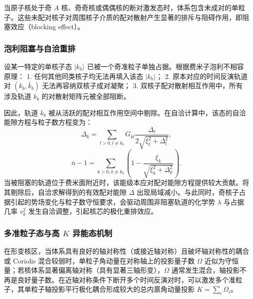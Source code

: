 当原子核处于奇 $A$ 核、奇奇核或偶偶核的断对激发态时，体系包含未成对的单粒子。这些未配对核子对周围核子介质的配对散射产生显著的排斥与阻碍作用，即阻塞效应（blocking effect）\cite{book-jain-nuclear-isomers}。


\subsubsection{泡利阻塞与自洽重排}\label{sec:2-3-泡利阻塞与自洽重排}


设某一特定的单核子态 $|k_b\rangle$ 已被一个奇准粒子单独占据。根据费米子泡利不相容原理：
1. 任何其他同类核子均无法再填入该态 $|k_b\rangle$；
2. 原本对应的时间反演轨道对 $(k_b, \bar{k}_b)$ 无法再容纳双核子成对凝聚；
3. 双核子配对散射相互作用中，所有涉及轨道 $k_b$ 的对散射矩阵元被全部阻断。

因此，轨道 $k_b$ 被从活跃的配对相互作用空间中剔除。在自洽计算中，该态的自洽能隙方程与粒子数方程变为：
\begin{equation}\label{eq:2-3-32}
\Delta_k = \sum_{l > 0, l \ne k_b} G_{kl} \frac{\Delta_l}{2 \sqrt{\xi_l^2 + \Delta_l^2}},
\end{equation}
\begin{equation}\label{eq:2-3-33}
\bar{n} - 1 = \sum_{k>0, k \ne k_b} \left( 1 - \frac{\xi_k}{\sqrt{\xi_k^2 + \Delta_k^2}} \right).
\end{equation}
当被阻塞的轨道位于费米面附近时，该能级本应对配对能隙方程提供较大贡献。将其剔除后，自洽求解得到的有效配对能隙 $\Delta$ 出现局域减小。与此同时，奇核子占据引起的势场变化与粒子数守恒要求，会驱动周围非阻塞轨道的化学势 $\lambda$ 与占据几率 $v_k^2$ 发生自洽调整，引起核芯的极化重排效应\cite{book-jain-nuclear-isomers}。


\subsubsection{多准粒子态与高 $K$ 异能态机制}\label{sec:2-3-多准粒子态与高k异能态机制}


在形变核区，当体系具有良好的轴对称性（或接近轴对称）且破坏轴对称性的耦合或 Coriolis 混合较弱时，单粒子角动量在对称轴上的投影量子数 $\Omega$ 近似为守恒量；若核体系显著偏离轴对称（具有显著三轴形变），$\Omega$ 通常发生混合，轴投影不再是良好量子数。在近轴对称条件下断开多个时间反演对时，可以激发多个准粒子，其单粒子轴投影平行极化耦合形成较大的总内禀角动量投影 $K = \sum_i \Omega_i$\cite{book-jain-nuclear-isomers}。

